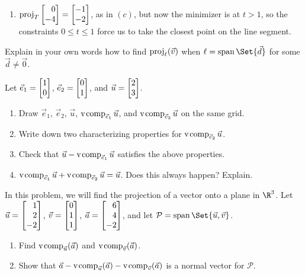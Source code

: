 \begin{exercises}
\begin{problist}
\begin{solution}
\begin{enumerate}
				\item $\Proj_{T} \mat{0\\-4}= \mat{-1\\-2}$, as
					in $(c)$, but now the minimizer is at $t>1$,
					so the constraints $0\leq t \leq 1$
					force us to take the closest point on
					the line segment.
			\end{enumerate}
		\end{solution}

		\prob Explain in your own words how to find
		$\operatorname{proj}_{\ell}(\vec v)$ when $\ell=\Span\Set{\vec d}$ for some
		$\vec d \neq \vec 0$.

		\prob Let $\vec e_{1}=\mat{1 \\ 0}$, $\vec e_{2} =\mat{0 \\ 1}$,
		and $\vec u = \mat{2 \\ 3}$.
		\begin{enumerate}
			\item Draw $\vec e_{1}$, $\vec e_{2}$, $\vec u$,
				$\operatorname{\operatorname{v\hspace{1pt}comp}}_{\vec e_1}\vec u$, and $\operatorname{\operatorname{v\hspace{1pt}comp}}_{\vec e_2}\vec
				u$ on the same grid.

			\item Write down two characterizing properties for $\operatorname{\operatorname{v\hspace{1pt}comp}}_{\vec
				e_2}\vec u$.

			\item Check that $\vec u - \operatorname{\operatorname{v\hspace{1pt}comp}}_{\vec e_1}\vec u$ satisfies
				the above properties.

			\item $\operatorname{\operatorname{v\hspace{1pt}comp}}_{{\vec e_1}}\vec u+\operatorname{\operatorname{v\hspace{1pt}comp}}_{{\vec e_2}}\vec u=\vec u$.
				Does this always happen? Explain.
		\end{enumerate}

		\prob In this problem, we will find the projection of a vector onto
		a plane in $\R^{3}$. Let $\vec u=\mat{1\\2\\-2}$, $\vec v = \mat{0\\1\\1}$,
		$\vec a = \mat{6\\4\\-2}$, and let $\mathcal P=\Span\Set{\vec u,\vec v}$.


		\begin{enumerate}
			\item Find $\operatorname{\operatorname{v\hspace{1pt}comp}}_{\vec u}(\vec a)$ and $\operatorname{\operatorname{v\hspace{1pt}comp}}_{\vec v}(\vec
				a)$.

			\item \label{PROBplaneproj} Show that
				$\vec a-\operatorname{\operatorname{v\hspace{1pt}comp}}_{\vec u}(\vec a)-\operatorname{\operatorname{v\hspace{1pt}comp}}_{\vec v}(\vec
				a)$
				is a normal vector for $\mathcal P$.


\end{enumerate}
\end{problist}
\end{exercises}

